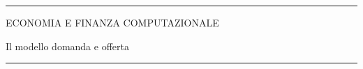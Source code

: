 \documentclass[12pt,aspectratio=169]{beamer}
\begin{document}
\begin{frame}
\unitlength 5mm

\begin{center}

\rule{\textwidth}{2pt}

\vskip3mm
ECONOMIA E FINANZA COMPUTAZIONALE

Il modello domanda e offerta

\rule{\textwidth}{2pt}

\end{center}

\end{frame}


\end{document}
